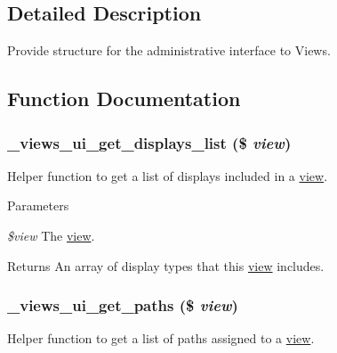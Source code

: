 \subsection{Detailed Description}
Provide structure for the administrative interface to Views. 

\subsection{Function Documentation}
\hypertarget{views__ui_8module_a7555ff14cf011bd02f883285154625e7}{
\subsubsection[{\_\-views\_\-ui\_\-get\_\-displays\_\-list}]{\setlength{\rightskip}{0pt plus 5cm}\_\-views\_\-ui\_\-get\_\-displays\_\-list (\$ {\em view})}}
\label{views__ui_8module_a7555ff14cf011bd02f883285154625e7}
Helper function to get a list of displays included in a \hyperlink{classview}{view}.


\begin{DoxyParams}{Parameters}
\item[{\em \$view}]The \hyperlink{classview}{view}.\end{DoxyParams}
\begin{DoxyReturn}{Returns}
An array of display types that this \hyperlink{classview}{view} includes. 
\end{DoxyReturn}
\hypertarget{views__ui_8module_a4ed6fe4d3b9596fd2315fdbe5b44ef04}{
\subsubsection[{\_\-views\_\-ui\_\-get\_\-paths}]{\setlength{\rightskip}{0pt plus 5cm}\_\-views\_\-ui\_\-get\_\-paths (\$ {\em view})}}
\label{views__ui_8module_a4ed6fe4d3b9596fd2315fdbe5b44ef04}
Helper function to get a list of paths assigned to a \hyperlink{classview}{view}.


